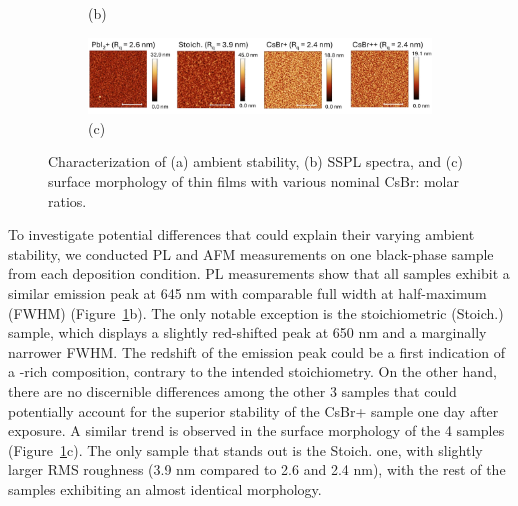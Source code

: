 \begin{figure}[htbp]
\begin{subfigure}[t]{0.45\textwidth}
        \caption*{(b)}
    \end{subfigure}

    \begin{subfigure}[t]{0.99\textwidth}
        \centering
        \includegraphics[width=\textwidth]{chapters/stability/imeges/Stability_Rotation_Stoich_AFM.pdf} %
        \caption*{(c)}
    \end{subfigure}

    \caption[Impact of nominal CsBr: molar ratio on ambient stability, PL, and surface morphology.]{Characterization of (a) ambient stability, (b) SSPL spectra, and (c) surface morphology of  thin films with various nominal CsBr: molar ratios.}
    \label{fig:stability:stoichiomtries_rotation}
\end{figure}

To investigate potential differences that could explain their varying ambient stability, we conducted PL and AFM measurements on one black-phase sample from each deposition condition. PL measurements show that all samples exhibit a similar emission peak at 645 nm with comparable full width at half-maximum (FWHM) (Figure~\ref{fig:stability:stoichiomtries_rotation}b). The only notable exception is the stoichiometric (Stoich.) sample, which displays a slightly red-shifted peak at 650 nm and a marginally narrower FWHM. The redshift of the emission peak could be a first indication of a -rich composition, contrary to the intended stoichiometry. On the other hand, there are no discernible differences among the other 3 samples that could potentially account for the superior stability of the CsBr+ sample one day after exposure. A similar trend is observed in the surface morphology of the 4 samples (Figure~\ref{fig:stability:stoichiomtries_rotation}c). The only sample that stands out is the Stoich. one, with slightly larger RMS roughness (3.9 nm compared to 2.6 and 2.4 nm), with the rest of the samples exhibiting an almost identical morphology. 


